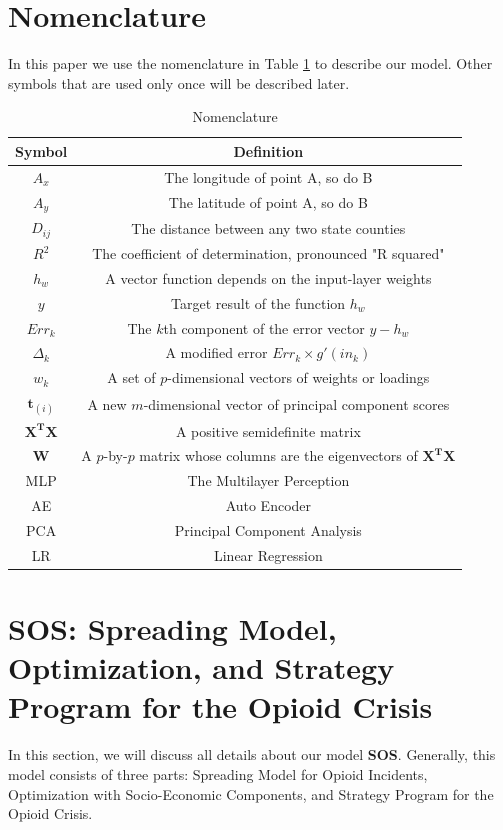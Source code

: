 \documentclass{mcmthesis}
\begin{document}
\section{Nomenclature}\label{Sec-Nomen}  %
In this paper we use the nomenclature in Table \ref{tab:Nomen} to describe our model. Other symbols that are used only once will be described later.
\begin{table}[H]
    \centering
    \caption{Nomenclature}
    \label{tab:Nomen}
    \begin{tabular}{c|c}
\hline
    	Symbol & Definition\\
\hline
	$A_x$ & The longitude of point A, so do B\\
	$A_y$ & The latitude of point A, so do B \\
    $D_{ij}$ &  The distance between any two state counties\\
    $R^2$ & The coefficient of determination, pronounced "R squared"\\
	$h_{w}$ & A vector function depends on the input-layer weights \\
	$y$ & Target result of the function $h_{w}$ \\
	$Err_k$ & The $k$th component of the error vector $y-h_{w}$\\
	$\Delta_k$ &  A modified error $Err _{k}\times g{}'\left ( in_{k} \right )$\\
	$w_{k}$ & A set of $p$-dimensional vectors of weights or loadings\\
	$\mathbf {t} _{(i)}$ & A new $m$-dimensional vector of principal component scores \\
	$\mathbf{X^TX}$ & A positive semidefinite matrix\\
	$\mathbf{W}$ & A $p$-by-$p$ matrix whose columns are the eigenvectors of $\mathbf{X^TX}$\\
    MLP	& The Multilayer Perception\\
    AE	& Auto Encoder\\
    PCA & Principal Component Analysis\\
    LR  & Linear Regression\\
\hline
    \end{tabular}
\end{table}    

\section{SOS: Spreading Model, Optimization, and Strategy Program for the Opioid Crisis} \label{Sec-Model}
In this section, we will discuss all details about our model \textbf{SOS}. Generally, this model consists of three parts: Spreading Model  for Opioid Incidents, Optimization with Socio-Economic Components, and Strategy Program for the Opioid Crisis.
\end{document}
